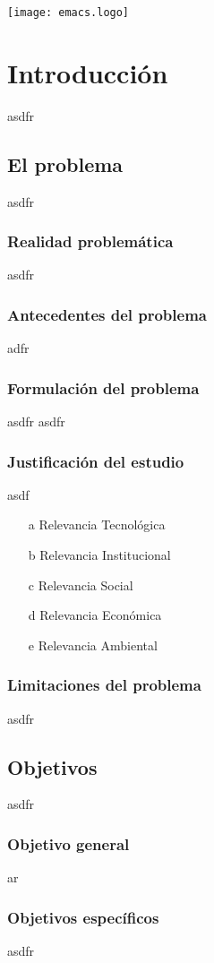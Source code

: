 \documentclass{report}
\title{}
\author{Llaksa}
\date{\today}
\begin{document}
\maketitle
\texttt{[image: emacs.logo]}
\tableofcontents
\newpage
{}

\chapter{Introducción}
asdfr
\section{El problema}
asdfr
\subsection{Realidad problemática}
asdfr
\subsection{Antecedentes del problema}
adfr
\subsection{Formulación del problema}
asdfr
asdfr
\subsection{Justificación del estudio}
asdf
\begin{enumerate}
\item[a] Relevancia Tecnológica
\item[b] Relevancia Institucional
\item[c] Relevancia Social
\item[d] Relevancia Económica
\item[e] Relevancia Ambiental
\end{enumerate}
\subsection{Limitaciones del problema}
asdfr
\section{Objetivos}
asdfr
\subsection{Objetivo general}
ar
\subsection{Objetivos específicos}
asdfr
\end{document}
